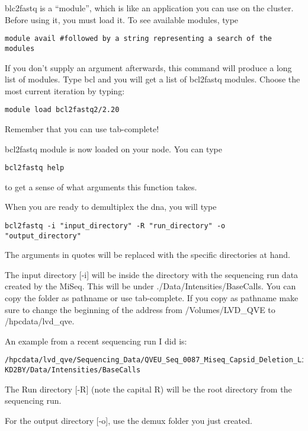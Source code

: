 \documentclass[
]{article}
\begin{document}
blc2fastq is a ``module'', which is like an application you can use on
the cluster. Before using it, you must load it. To see available
modules, type

\begin{verbatim}
module avail #followed by a string representing a search of the modules
\end{verbatim}

If you don't supply an argument afterwards, this command will produce a
long list of modules. Type bcl and you will get a list of bcl2fastq
modules. Choose the most current iteration by typing:

\begin{verbatim}
module load bcl2fastq2/2.20
\end{verbatim}

Remember that you can use tab-complete!

bcl2fastq module is now loaded on your node. You can type

\begin{verbatim}
bcl2fastq help
\end{verbatim}

to get a sense of what arguments this function takes.

When you are ready to demultiplex the dna, you will type

\begin{verbatim}
bcl2fastq -i "input_directory" -R "run_directory" -o "output_directory"
\end{verbatim}

The arguments in quotes will be replaced with the specific directories
at hand.

The input directory {[}-i{]} will be inside the directory with the
sequencing run data created by the MiSeq. This will be under
./Data/Intensities/BaseCalls. You can copy the folder as pathname or use
tab-complete. If you copy as pathname make sure to change the beginning
of the address from /Volumes/LVD\_QVE to /hpcdata/lvd\_qve.

An example from a recent sequencing run I did is:

\begin{verbatim}
/hpcdata/lvd_qve/Sequencing_Data/QVEU_Seq_0087_Miseq_Capsid_Deletion_Library_EV71_WalkerOrr/QVEU_Seq0087_WO_WB_04_Capsiddel_Replicationdel_DIMPLE/230820_M02211_0114_000000000-KD2BY/Data/Intensities/BaseCalls
\end{verbatim}

The Run directory {[}-R{]} (note the capital R) will be the root
directory from the sequencing run.

For the output directory {[}-o{]}, use the demux folder you just
created.
\end{document}
